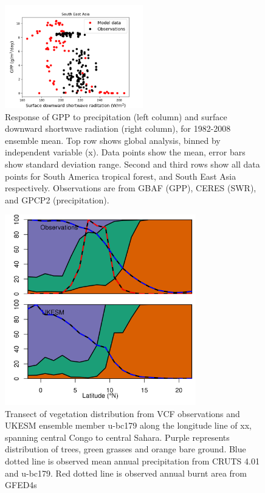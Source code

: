 \begin{figure}[t]
    \includegraphics[width=6cm]{figs/GPPresponse/br.png}
    \caption{Response of GPP to precipitation (left column) and surface downward shortwave radiation (right column), for 1982-2008 ensemble mean. Top row shows global analysis, binned by independent variable (x). Data points show the mean, error bars show standard deviation range. Second and third rows show all data points for South America tropical forest, and South East Asia respectively. Observations are from GBAF (GPP), CERES (SWR), and GPCP2 (precipitation). \label{fig:GPPresponses}}
\end{figure}


\begin{figure}[t]
\includegraphics[width=8.3cm]{figs/trasect_AFRICA.png}
\caption{Transect of vegetation distribution from VCF observations and UKESM ensemble member u-bc179 along the longitude line of xx, spanning central Congo to central Sahara. Purple represents distribution of trees, green grasses and orange bare ground. Blue dotted line is observed mean annual precipitation from CRUTS 4.01 and u-bc179. Red dotted line is observed annual burnt area from GFED4s}
\end{figure}


